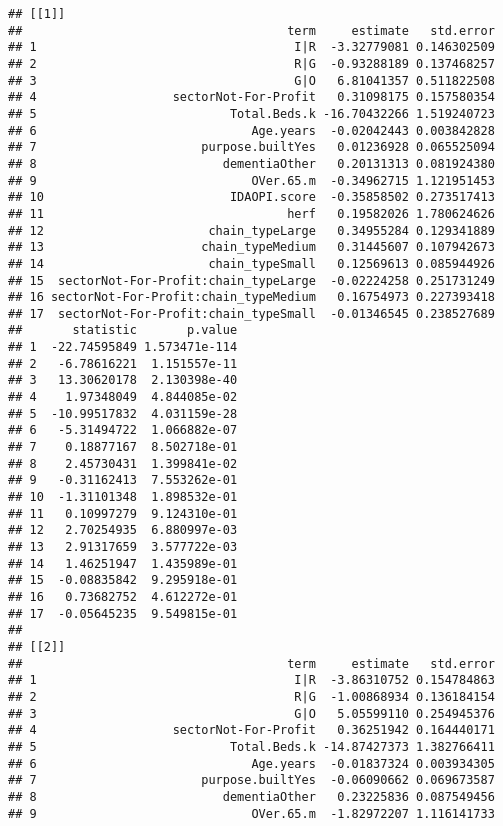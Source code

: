 \documentclass[]{article}
\begin{document}
\begin{verbatim}
## [[1]]
##                                     term     estimate   std.error
## 1                                    I|R  -3.32779081 0.146302509
## 2                                    R|G  -0.93288189 0.137468257
## 3                                    G|O   6.81041357 0.511822508
## 4                   sectorNot-For-Profit   0.31098175 0.157580354
## 5                           Total.Beds.k -16.70432266 1.519240723
## 6                              Age.years  -0.02042443 0.003842828
## 7                       purpose.builtYes   0.01236928 0.065525094
## 8                          dementiaOther   0.20131313 0.081924380
## 9                              OVer.65.m  -0.34962715 1.121951453
## 10                          IDAOPI.score  -0.35858502 0.273517413
## 11                                  herf   0.19582026 1.780624626
## 12                       chain_typeLarge   0.34955284 0.129341889
## 13                      chain_typeMedium   0.31445607 0.107942673
## 14                       chain_typeSmall   0.12569613 0.085944926
## 15  sectorNot-For-Profit:chain_typeLarge  -0.02224258 0.251731249
## 16 sectorNot-For-Profit:chain_typeMedium   0.16754973 0.227393418
## 17  sectorNot-For-Profit:chain_typeSmall  -0.01346545 0.238527689
##       statistic       p.value
## 1  -22.74595849 1.573471e-114
## 2   -6.78616221  1.151557e-11
## 3   13.30620178  2.130398e-40
## 4    1.97348049  4.844085e-02
## 5  -10.99517832  4.031159e-28
## 6   -5.31494722  1.066882e-07
## 7    0.18877167  8.502718e-01
## 8    2.45730431  1.399841e-02
## 9   -0.31162413  7.553262e-01
## 10  -1.31101348  1.898532e-01
## 11   0.10997279  9.124310e-01
## 12   2.70254935  6.880997e-03
## 13   2.91317659  3.577722e-03
## 14   1.46251947  1.435989e-01
## 15  -0.08835842  9.295918e-01
## 16   0.73682752  4.612272e-01
## 17  -0.05645235  9.549815e-01
## 
## [[2]]
##                                     term     estimate   std.error
## 1                                    I|R  -3.86310752 0.154784863
## 2                                    R|G  -1.00868934 0.136184154
## 3                                    G|O   5.05599110 0.254945376
## 4                   sectorNot-For-Profit   0.36251942 0.164440171
## 5                           Total.Beds.k -14.87427373 1.382766411
## 6                              Age.years  -0.01837324 0.003934305
## 7                       purpose.builtYes  -0.06090662 0.069673587
## 8                          dementiaOther   0.23225836 0.087549456
## 9                              OVer.65.m  -1.82972207 1.116141733

\end{verbatim}
\end{document}

